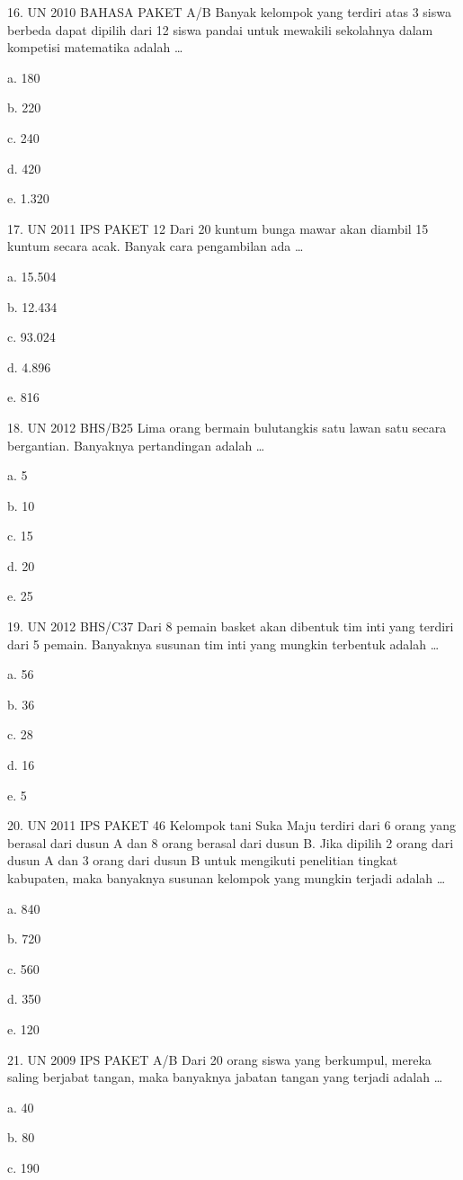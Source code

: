 \documentclass[11pt,fleqn]{book} %
\begin{document}
16.	UN 2010 BAHASA PAKET A/B 
Banyak kelompok yang terdiri atas 3 siswa berbeda dapat dipilih dari 12 siswa pandai untuk mewakili sekolahnya dalam kompetisi matematika adalah …

a.	180

b.	220

c.	240

d.	420

e.	1.320

17.	UN 2011 IPS PAKET 12 
Dari 20 kuntum bunga mawar akan diambil 15 kuntum secara acak. Banyak cara pengambilan ada …

a.	15.504

b.	12.434

c.	93.024

d.	4.896

e.	816

18.	UN 2012 BHS/B25 
Lima orang bermain bulutangkis satu lawan satu secara bergantian. Banyaknya pertandingan adalah …

a.	5

b.	10

c.	15

d.	20

e.	25

19.	UN 2012 BHS/C37 
Dari 8 pemain basket akan dibentuk tim inti yang terdiri dari 5 pemain. Banyaknya susunan tim inti yang mungkin terbentuk adalah …

a.	56

b.	36

c.	28

d.	16

e.	5

20.	UN 2011 IPS PAKET 46 
Kelompok tani Suka Maju terdiri dari 6 orang yang berasal dari dusun A dan 8 orang berasal dari dusun B. Jika dipilih 2 orang dari dusun A dan 3 orang dari dusun B untuk mengikuti penelitian tingkat kabupaten, maka banyaknya susunan kelompok yang mungkin terjadi adalah …

a.	840

b.	720

c.	560

d.	350

e.	120

21.	UN 2009 IPS PAKET A/B 
Dari 20 orang siswa yang berkumpul, mereka saling berjabat tangan, maka banyaknya jabatan tangan yang terjadi adalah …

a.	40

b.	80


c.	190
\end{document}

